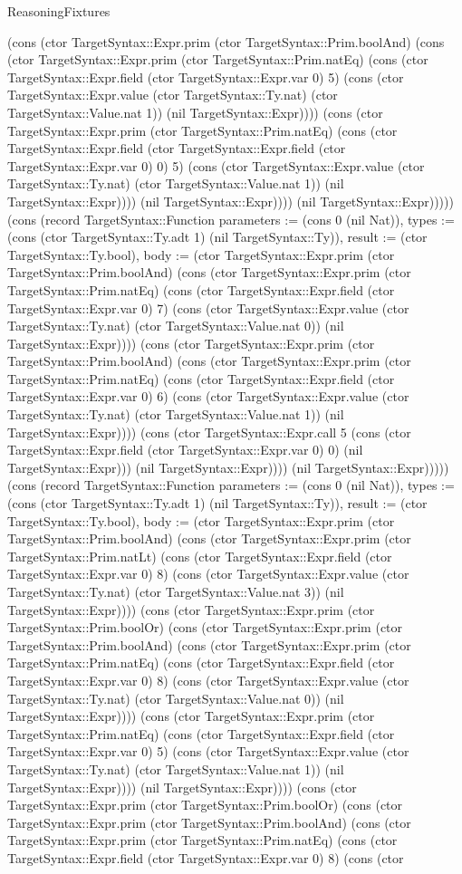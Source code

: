 \begin{lexlean}{ReasoningFixtures}
\begin{semanticmodule}
{(cons (ctor TargetSyntax::Expr.prim (ctor TargetSyntax::Prim.boolAnd) (cons (ctor TargetSyntax::Expr.prim (ctor TargetSyntax::Prim.natEq) (cons (ctor TargetSyntax::Expr.field (ctor TargetSyntax::Expr.var 0) 5) (cons (ctor TargetSyntax::Expr.value (ctor TargetSyntax::Ty.nat) (ctor TargetSyntax::Value.nat 1)) (nil TargetSyntax::Expr)))) (cons (ctor TargetSyntax::Expr.prim (ctor TargetSyntax::Prim.natEq) (cons (ctor TargetSyntax::Expr.field (ctor TargetSyntax::Expr.field (ctor TargetSyntax::Expr.var 0) 0) 5) (cons (ctor TargetSyntax::Expr.value (ctor TargetSyntax::Ty.nat) (ctor TargetSyntax::Value.nat 1)) (nil TargetSyntax::Expr)))) (nil TargetSyntax::Expr)))) (nil TargetSyntax::Expr))))}) (cons (record TargetSyntax::Function {parameters := (cons 0 (nil Nat)), types := (cons (ctor TargetSyntax::Ty.adt 1) (nil TargetSyntax::Ty)), result := (ctor TargetSyntax::Ty.bool), body := (ctor TargetSyntax::Expr.prim (ctor TargetSyntax::Prim.boolAnd) (cons (ctor TargetSyntax::Expr.prim (ctor TargetSyntax::Prim.natEq) (cons (ctor TargetSyntax::Expr.field (ctor TargetSyntax::Expr.var 0) 7) (cons (ctor TargetSyntax::Expr.value (ctor TargetSyntax::Ty.nat) (ctor TargetSyntax::Value.nat 0)) (nil TargetSyntax::Expr)))) (cons (ctor TargetSyntax::Expr.prim (ctor TargetSyntax::Prim.boolAnd) (cons (ctor TargetSyntax::Expr.prim (ctor TargetSyntax::Prim.natEq) (cons (ctor TargetSyntax::Expr.field (ctor TargetSyntax::Expr.var 0) 6) (cons (ctor TargetSyntax::Expr.value (ctor TargetSyntax::Ty.nat) (ctor TargetSyntax::Value.nat 1)) (nil TargetSyntax::Expr)))) (cons (ctor TargetSyntax::Expr.call 5 (cons (ctor TargetSyntax::Expr.field (ctor TargetSyntax::Expr.var 0) 0) (nil TargetSyntax::Expr))) (nil TargetSyntax::Expr)))) (nil TargetSyntax::Expr))))}) (cons (record TargetSyntax::Function {parameters := (cons 0 (nil Nat)), types := (cons (ctor TargetSyntax::Ty.adt 1) (nil TargetSyntax::Ty)), result := (ctor TargetSyntax::Ty.bool), body := (ctor TargetSyntax::Expr.prim (ctor TargetSyntax::Prim.boolAnd) (cons (ctor TargetSyntax::Expr.prim (ctor TargetSyntax::Prim.natLt) (cons (ctor TargetSyntax::Expr.field (ctor TargetSyntax::Expr.var 0) 8) (cons (ctor TargetSyntax::Expr.value (ctor TargetSyntax::Ty.nat) (ctor TargetSyntax::Value.nat 3)) (nil TargetSyntax::Expr)))) (cons (ctor TargetSyntax::Expr.prim (ctor TargetSyntax::Prim.boolOr) (cons (ctor TargetSyntax::Expr.prim (ctor TargetSyntax::Prim.boolAnd) (cons (ctor TargetSyntax::Expr.prim (ctor TargetSyntax::Prim.natEq) (cons (ctor TargetSyntax::Expr.field (ctor TargetSyntax::Expr.var 0) 8) (cons (ctor TargetSyntax::Expr.value (ctor TargetSyntax::Ty.nat) (ctor TargetSyntax::Value.nat 0)) (nil TargetSyntax::Expr)))) (cons (ctor TargetSyntax::Expr.prim (ctor TargetSyntax::Prim.natEq) (cons (ctor TargetSyntax::Expr.field (ctor TargetSyntax::Expr.var 0) 5) (cons (ctor TargetSyntax::Expr.value (ctor TargetSyntax::Ty.nat) (ctor TargetSyntax::Value.nat 1)) (nil TargetSyntax::Expr)))) (nil TargetSyntax::Expr)))) (cons (ctor TargetSyntax::Expr.prim (ctor TargetSyntax::Prim.boolOr) (cons (ctor TargetSyntax::Expr.prim (ctor TargetSyntax::Prim.boolAnd) (cons (ctor TargetSyntax::Expr.prim (ctor TargetSyntax::Prim.natEq) (cons (ctor TargetSyntax::Expr.field (ctor TargetSyntax::Expr.var 0) 8) (cons (ctor }
\end{semanticmodule}
\end{lexlean}
